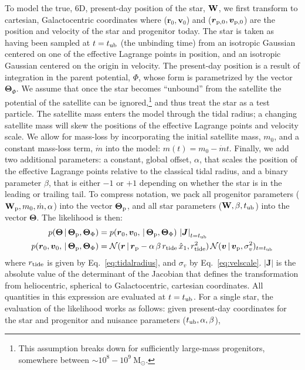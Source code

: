 \documentclass[letterpaper,12pt,preprint]{aastex}
\newcommand{\given}{\,|\,}
\newcommand{\msun}{\mathrm{M}_\odot}
\newcommand{\W}{{\bf W}}
\newcommand{\J}{{\boldsymbol J}}
\newcommand{\rtide}{r_{\rm tide}}
\newcommand{\bs}{\boldsymbol}
\newcommand{\sat}{{\rm p}}
\newcommand{\tub}{t_{\rm ub}}
\newcommand{\tailbit}{\beta}
\newcommand{\Loffset}{\alpha}
\begin{document}
To model the true, 6D, present-day position of the star, $\W$, we first transform to cartesian, Galactocentric coordinates where ($\bs{r}_0,\bs{v}_0$) and ($\bs{r}_{\sat,0},\bs{v}_{\sat,0}$) are the position and velocity of the star and progenitor today. The star is taken as having been sampled at $t=\tub$ (the unbinding time) from an isotropic Gaussian centered on one of the effective Lagrange points in position, and an isotropic Gaussian centered on the origin in velocity. The present-day position is a result of integration in the parent potential, $\Phi$, whose form is parametrized by the vector $\bs{\Theta}_\Phi$. We assume that once the star becomes ``unbound'' from the satellite the potential of the satellite can be ignored,\footnote{This assumption breaks down for sufficiently large-mass progenitors, somewhere between $\sim10^8-10^9~\msun$.} and thus treat the star as a test particle. The satellite mass enters the model through the tidal radius; a changing satellite mass will skew the positions of the effective Lagrange points and velocity scale. We allow for mass-loss by incorporating the initial satellite mass, $m_0$, and a constant mass-loss term, $\dot{m}$ into the model: $m(t) = m_0 - \dot{m}t$. Finally, we add two additional parameters: a constant, global offset, $\Loffset$, that scales the position of the effective Lagrange points relative to the classical tidal radius, and a binary parameter $\tailbit$, that is either $-1$ or $+1$ depending on whether the star is in the leading or trailing tail. To compress notation, we pack all progenitor parameters ($\W_\sat, m_0, \dot{m}, \Loffset$) into the vector $\bs{\Theta}_\sat$, and all star parameters ($\W, \tailbit, \tub$) into the vector $\bs{\Theta}$. The likelihood is then:
\begin{align}
	p(\bs{\Theta} \given \bs{\Theta}_\sat, \bs{\Theta}_\Phi) &= p(\bs{r}_0,\bs{v}_0, \given \bs{\Theta}_\sat, \bs{\Theta}_\Phi)\,\left\vert\J\right\vert_{t=\tub}\label{eq:starlike}\\
	p(\bs{r}_0,\bs{v}_0, \given \bs{\Theta}_\sat, \bs{\Theta}_\Phi) &= \mathcal{N}(\bs{r} \given \bs{r}_\sat - \Loffset\,\tailbit\,\rtide\,\hat{x}_1, \rtide^2)\,\mathcal{N}(\bs{v} \given \bs{v}_\sat, \sigma^2_v)_{t=\tub}
\end{align}
where $\rtide$ is given by Eq.~\ref{eq:tidalradius}, and $\sigma_v$ by Eq.~\ref{eq:velscale}. $\left\vert\J\right\vert$ is the absolute value of the determinant of the Jacobian that defines the transformation from heliocentric, spherical to Galactocentric, cartesian coordinates. All quantities in this expression are evaluated at $t=\tub$. For a single star, the evaluation of the likelihood works as follows: given present-day coordinates for the star and progenitor and nuisance parameters ($\tub,\Loffset,\tailbit$),
\end{document}
